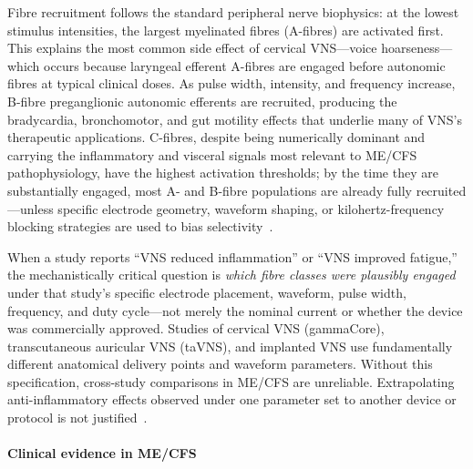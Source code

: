 Fibre recruitment follows the standard peripheral nerve biophysics: at the lowest stimulus intensities, the largest myelinated fibres (A-fibres) are activated first. This explains the most common side effect of cervical VNS---voice hoarseness---which occurs because laryngeal efferent A-fibres are engaged before autonomic fibres at typical clinical doses. As pulse width, intensity, and frequency increase, B-fibre preganglionic autonomic efferents are recruited, producing the bradycardia, bronchomotor, and gut motility effects that underlie many of VNS's therapeutic applications. C-fibres, despite being numerically dominant and carrying the inflammatory and visceral signals most relevant to ME/CFS pathophysiology, have the highest activation thresholds; by the time they are substantially engaged, most A- and B-fibre populations are already fully recruited---unless specific electrode geometry, waveform shaping, or kilohertz-frequency blocking strategies are used to bias selectivity~\cite{Bu2026VNSReview}.

\begin{limitation}
\label{lim:vns-fibre-selectivity}
When a study reports ``VNS reduced inflammation'' or ``VNS improved fatigue,'' the mechanistically critical question is \emph{which fibre classes were plausibly engaged} under that study's specific electrode placement, waveform, pulse width, frequency, and duty cycle---not merely the nominal current or whether the device was commercially approved. Studies of cervical VNS (gammaCore), transcutaneous auricular VNS (taVNS), and implanted VNS use fundamentally different anatomical delivery points and waveform parameters. Without this specification, cross-study comparisons in ME/CFS are unreliable. Extrapolating anti-inflammatory effects observed under one parameter set to another device or protocol is not justified~\cite{Bu2026VNSReview}.
\end{limitation}

\paragraph{Clinical evidence in ME/CFS}

